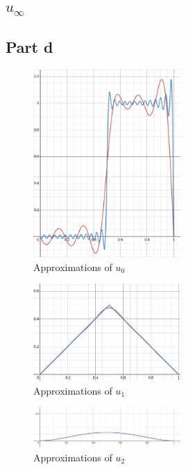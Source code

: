 \documentclass{article}
\begin{document}
\subsection{$u_\infty$}
\subsection{Part d}
\begin{figure}[ht]
\caption{Approximations of $u_0$}
\centering
\includegraphics[width=0.5\textwidth]{u_0Approx.png}
\end{figure}

\begin{figure}[ht]
\caption{Approximations of $u_1$}
\centering
\includegraphics[width=0.5\textwidth]{u_1Approx.png}
\end{figure}

\begin{figure}[ht]
\caption{Approximations of $u_2$}
\centering
\includegraphics[width=0.5\textwidth]{u_2Approx.png}
\end{figure}
\end{document}
